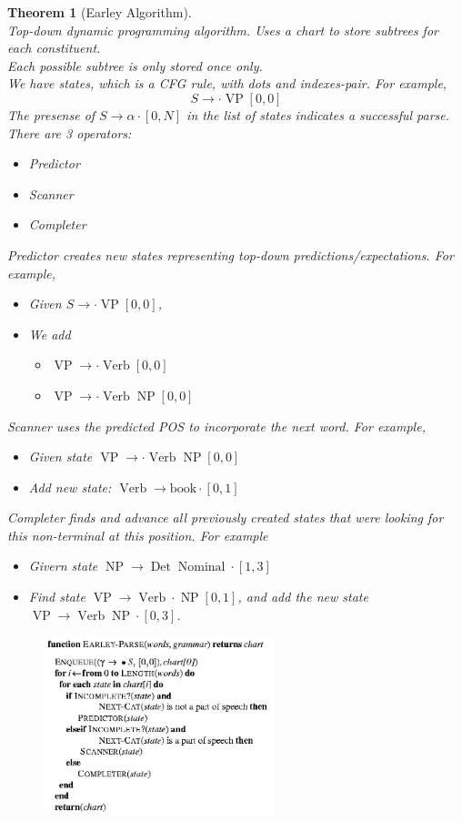 \documentclass[12pt]{article}
\newtheorem{theorem}{Theorem}[section]
\theoremstyle{definition}
\DeclareMathOperator{\NP}{NP}
\DeclareMathOperator{\VP}{VP}
\DeclareMathOperator{\Det}{Det}
\DeclareMathOperator{\Nominal}{Nominal}
\DeclareMathOperator{\Verb}{Verb}
\begin{document}
\begin{theorem}[Earley Algorithm]
\hfill\\\normalfont Top-down dynamic programming algorithm. Uses a chart to store subtrees for each constituent.\\
Each possible subtree is only stored once only.\\
We have states, which is a CFG rule, with dots and indexes-pair. For example,
\[
S\to \cdot \VP [0,0]
\]
The presense of $S\to \alpha \cdot [0, N]$ in the list of states indicates a successful parse.\\
There are 3 operators:
\begin{itemize}
	\item Predictor
	\item Scanner
	\item Completer
\end{itemize}
Predictor creates new states representing top-down predictions/expectations. For example,
\begin{itemize}
	\item Given $S\to \cdot \VP [0,0]$,
	\item We add
	\begin{itemize}
		\item $\VP\to \cdot \Verb [0,0]$
		\item $\VP\to \cdot \Verb \NP[0,0]$
	\end{itemize}
\end{itemize}
Scanner uses the predicted POS to incorporate the next word. For example, 
\begin{itemize}
	\item Given state $\VP\to\cdot \Verb \NP [0,0]$
	\item Add new state: $\Verb \to \text{book} \cdot [0,1]$
\end{itemize}
Completer finds and advance all previously created states that were looking for this non-terminal at this position. For example
\begin{itemize}
	\item Givern state $\NP\to \Det \Nominal \cdot [1,3]$
	\item Find state $\VP\to \Verb \cdot \NP[0,1]$, and add the new state $\VP\to \Verb \NP\cdot [0,3]$.
\end{itemize}
\begin{figure}[h]
\centering
\includegraphics[width=0.6\textwidth]{earley.jpg}

\end{figure}
\end{theorem}
\end{document}
